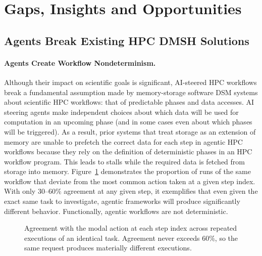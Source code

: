 
\section{Gaps, Insights and Opportunities}

\subsection{Agents Break Existing HPC DMSH Solutions}

\paragraph{Agents Create Workflow Nondeterminism.}
Although their impact on scientific goals is significant, AI-steered HPC
workflows break a fundamental assumption made by memory-storage software DSM
systems about scientific HPC workflows: that of predictable phases and data
accesses. AI steering agents make independent choices about which data will be
used for computation in an upcoming phase (and in some cases even about which
phases will be triggered). As a result, prior systems that treat storage as an
extension of memory are unable to prefetch the correct data for each step in
agentic HPC workflows because they rely on the definition of deterministic
phases in an HPC workflow program. This leads to stalls while the required
data is fetched from storage into memory. Figure~\ref{fig:predictability}
demonstrates the proportion of runs of the same workflow that deviate from the
most common action taken at a given step index. With only 30--60\% agreement
at any given step, it exemplifies that even given the exact same task to
investigate, agentic frameworks will produce significantly different behavior.
Functionally, agentic workflows are not deterministic.

\begin{figure}[t]
\centering
{}
\caption{Agreement with the modal action at each step index across repeated
executions of an identical task. Agreement never exceeds 60\%, so the same
request produces materially different executions.}
\label{fig:predictability}
\end{figure}


